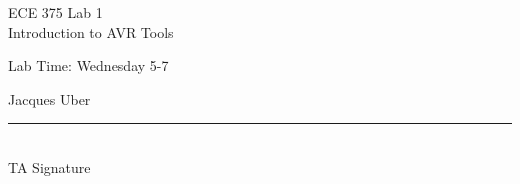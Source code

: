 \documentclass[12pt,letterpaper]{article}
\begin{document}
\begin{titlepage}
    \vspace*{4cm}
    \begin{flushright}
    {\huge
        ECE 375 Lab 1\\[1cm]
    }
    {\large
        Introduction to AVR Tools
    }
    \end{flushright}
    \begin{flushleft}
    Lab Time: Wednesday 5-7
    \end{flushleft}
    \begin{flushright}
    Jacques Uber
    \vfill
    \rule{5in}{.5mm}\\
    TA Signature
    \end{flushright}

\end{titlepage}
\end{document}
